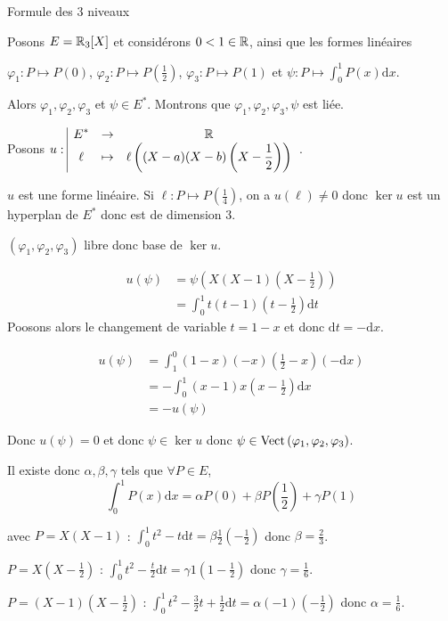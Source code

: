 \begin{exemple}
    Formule des 3 niveaux 

    Posons $E = \mathbb{R}_3[X]$ et considérons $0 < 1 \in \mathbb{R}$, ainsi que les formes linéaires 

    $\varphi_1 : P \mapsto P(0)$, $\varphi_2 : P \mapsto P\left( \frac{1}{2 } \right)$, $\varphi_3 : P \mapsto P(1)$
    et $\psi : P \mapsto \int_0^1 P(x) \mathrm d x$.

    Alors $\varphi_1, \varphi_2, \varphi_3$ et $\psi \in E^*$. Montrons que $\varphi_1, \varphi_2, \varphi_3, \psi$ est liée. 

    Posons $u: \space \begin{array}{|ccc} \displaystyle E^* & \to & \displaystyle \mathbb{R} \\ \displaystyle \ell & \mapsto & \displaystyle \ell\left( (X - a)(X - b) \left(X - \frac{1} 2 \right) \right) \end{array}$.

    $u$ est une forme linéaire. Si $\ell : P \mapsto P\left( \frac 1 4 \right)$, on a $u(\ell) \neq 0$
    donc $\ker u$ est un hyperplan de $E^*$ donc est de dimension $3$.

    $(\varphi_1, \varphi_2, \varphi_3)$ libre donc base de $\ker u$.

    \begin{align}
        u(\psi) & = \psi\left( X(X - 1) \left( X - \frac{1} 2 \right) \right) \\
        & = \int_0^1 t(t - 1) \left( t - \frac{1} 2 \right) \mathrm d t 
    \end{align}
    Poosons alors le changement de variable $t = 1 - x$ et donc $\mathrm d t = - \mathrm d x$.

    \begin{align}
        u(\psi) & = \int_1^0 (1 - x)(-x) \left( \frac 1 2 - x \right) (- \mathrm d x) \\
        & = - \int_0^1 (x - 1)x \left( x - \frac 1 2 \right) \mathrm d x \\
        & = - u(\psi) 
    \end{align}

    Donc $u(\psi) = 0$ et donc $\psi \in \ker u$ donc $\psi \in \operatorname{Vect} \,(\varphi_1, \varphi_2, \varphi_3)$.

    Il existe donc $\alpha, \beta, \gamma$ tels que $\forall P \in E$, 
    $$\int_0^1 P(x) \mathrm d x = \alpha P(0) + \beta P\left( \frac 1 2 \right) + \gamma P(1)$$

    avec $P = X(X - 1)$ : 
    $\int_0^1 t^2 - t \mathrm d t = \beta \frac 1 2 \left( - \frac 1 2 \right)$ donc $\beta = \frac 2 3$.

    $P = X\left( X - \frac 1 2 \right)$ : 
    $\int_0^1 t^2 - \frac t 2 \mathrm d t = \gamma 1 (1 - \frac 1 2 )$ donc $\gamma = \frac 1 6$.

    $P = (X - 1) \left( X - \frac 1 2 \right)$ : 
    $\int_0^1 t^2 - \frac 3 2 t + \frac 1 2 \mathrm d t = \alpha (-1)(- \frac 1 2 )$ donc $\alpha = \frac 1 6$.
\end{exemple}



